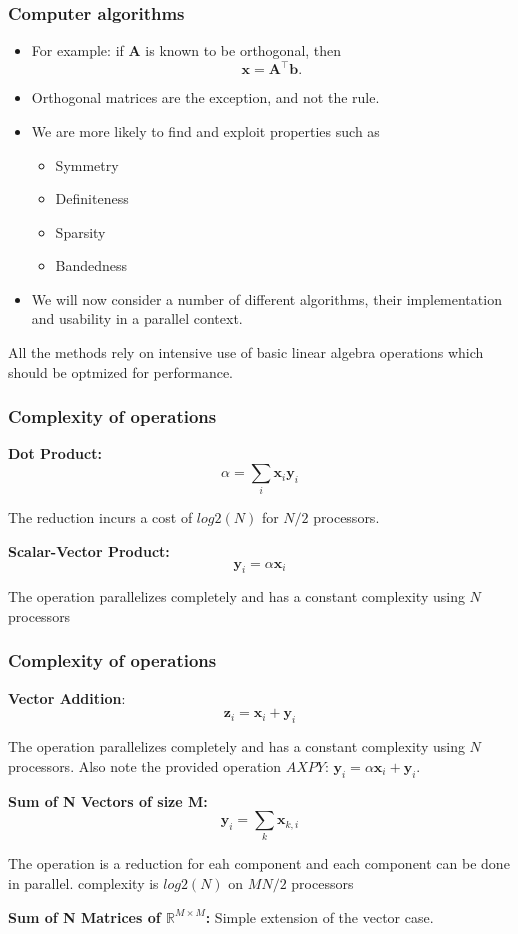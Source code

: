 \begin{frame}
  \frametitle{Computer algorithms}
  \begin{itemize}
  \item For example: if $\bm A$ is known to be orthogonal, then
    \[ \bm x = \bm A^\intercal \bm b. \]
  \item Orthogonal matrices are the exception, and not the rule.
  \item We are more likely to find and exploit properties such as
    \begin{itemize}
    \item Symmetry
    \item Definiteness
    \item Sparsity
    \item Bandedness
    \end{itemize}
  \item We will now consider a number of different algorithms, their
    implementation and usability in a parallel context.
  \end{itemize}

\medskip
All the methods rely on intensive use of basic linear algebra operations which should be optmized for performance.
\end{frame}

\begin{frame}
  \frametitle{Complexity of operations}

\textbf{Dot Product:}
\[
\alpha = \sum_i \bm x_i \bm y_i
\]

\medskip
The reduction incurs a cost of $log2(N)$ for $N/2$ processors.

\bigskip
\textbf{Scalar-Vector Product:}
\[
\bm y_i = \alpha \bm x_i
\]

\medskip
The operation parallelizes completely and has a constant complexity using $N$ processors

\end{frame}

\begin{frame}
  \frametitle{Complexity of operations}

\textbf{Vector Addition}:
\[
\bm z_i = \bm x_i + \bm y_i
\]

\medskip
The operation parallelizes completely and has a constant complexity using $N$ processors.
Also note the provided operation $AXPY$: $\bm y_i = \alpha\bm x_i + \bm y_i$.


\bigskip
\textbf{Sum of N Vectors of size M:}
\[
\bm y_i = \sum_k \bm x_{k,i}
\]

\medskip
The operation is a reduction for eah component and each component can be done in parallel. complexity is $log2(N)$ on $M N/2$ processors

\bigskip
\textbf{Sum of N Matrices of $\mathbb R^{M\times M}$:} Simple extension of the vector case.

\end{frame}


